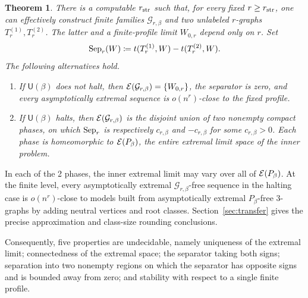 \documentclass[10pt]{article}
\numberwithin{equation}{section}
\newtheorem{theorem}{Theorem}[section]
\theoremstyle{definition}
\newcommand{\cG}{\mathcal G}\newcommand{\cH}{\mathcal H}\newcommand{\cJ}{\mathcal J}
\begin{document}
\begin{theorem}\label{thm:structural}
There is a computable $r_{\rm str}$ such that, for every fixed $r\ge r_{\rm str}$, one can effectively construct finite families $\cG_{r,\beta}$ and two unlabeled $r$-graphs $T_r^{(1)},T_r^{(2)}$. The latter and a finite-profile limit $W_{0,r}$ depend only on $r$. Set
\[
 \operatorname{Sep}_r(W)\coloneqq t(T_r^{(1)},W)-t(T_r^{(2)},W).
\]
The following alternatives hold.
\begin{enumerate}
\item If $\mathsf U(\beta)$ does not halt, then $\cE(\cG_{r,\beta})=\{W_{0,r}\}$, the separator is zero, and every asymptotically extremal sequence is $o(n^r)$-close to the fixed profile.
\item If $\mathsf U(\beta)$ halts, then $\cE(\cG_{r,\beta})$ is the disjoint union of two nonempty compact phases, on which $\operatorname{Sep}_r$ is respectively $c_{r,\beta}$ and $-c_{r,\beta}$ for some $c_{r,\beta}>0$. Each phase is homeomorphic to $\mathcal E(P_\beta)$, the entire extremal limit space of the inner problem.
\end{enumerate}
\end{theorem}
In each of the 2 phases, the inner extremal limit may vary over all of $\mathcal E(P_\beta)$. At the finite level, every asymptotically extremal $\cG_{r,\beta}$-free sequence in the halting case is $o(n^r)$-close to models built from asymptotically extremal $P_\beta$-free $3$-graphs by adding neutral vertices and root classes. Section~\ref{sec:transfer} gives the precise approximation and class-size rounding conclusions.

Consequently, five properties are undecidable, namely uniqueness of the extremal limit; connectedness of the extremal space; the separator taking both signs; separation into two nonempty regions on which the separator has opposite signs and is bounded away from zero; and stability with respect to a single finite profile.
\end{document}
